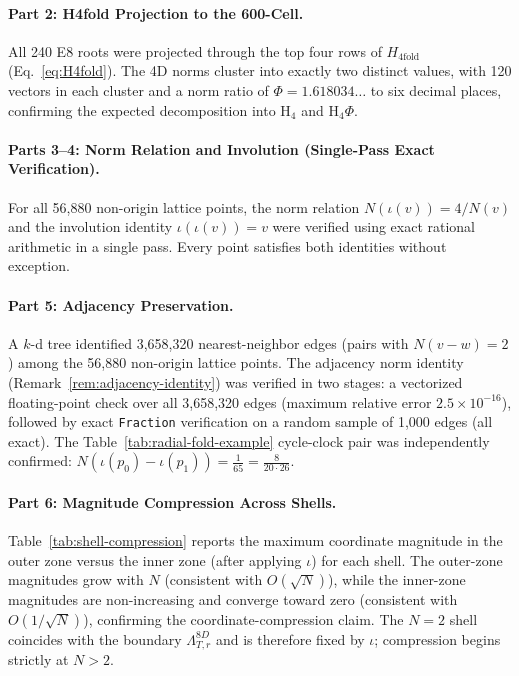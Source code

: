 \documentclass{article}
\begin{document}
\paragraph{Part 2: H4fold Projection to the 600-Cell.}
All 240 E8 roots were projected through the top four rows of $H_{4\mathrm{fold}}$ (Eq.~\ref{eq:H4fold}). The 4D norms cluster into exactly two distinct values, with 120 vectors in each cluster and a norm ratio of $\Phi = 1.618034\ldots$ to six decimal places, confirming the expected decomposition into $\mathrm{H}_4$ and $\mathrm{H}_4\Phi$.

\paragraph{Parts 3--4: Norm Relation and Involution (Single-Pass Exact Verification).}
For all 56{,}880 non-origin lattice points, the norm relation $N(\iota(v)) = 4/N(v)$ and the involution identity $\iota(\iota(v)) = v$ were verified using exact rational arithmetic in a single pass. Every point satisfies both identities without exception.

\paragraph{Part 5: Adjacency Preservation.}
A $k$-d tree identified 3{,}658{,}320 nearest-neighbor edges (pairs with $N(v - w) = 2$) among the 56{,}880 non-origin lattice points. The adjacency norm identity (Remark~\ref{rem:adjacency-identity}) was verified in two stages: a vectorized floating-point check over all 3{,}658{,}320 edges (maximum relative error $2.5 \times 10^{-16}$), followed by exact \texttt{Fraction} verification on a random sample of 1{,}000 edges (all exact). The Table~\ref{tab:radial-fold-example} cycle-clock pair was independently confirmed: $N(\iota(p_0) - \iota(p_1)) = \frac{1}{65} = \frac{8}{20 \cdot 26}$.

\paragraph{Part 6: Magnitude Compression Across Shells.}
Table~\ref{tab:shell-compression} reports the maximum coordinate magnitude in the outer zone versus the inner zone (after applying $\iota$) for each shell. The outer-zone magnitudes grow with $N$ (consistent with $O(\sqrt{N})$), while the inner-zone magnitudes are non-increasing and converge toward zero (consistent with $O(1/\sqrt{N})$), confirming the coordinate-compression claim. The $N = 2$ shell coincides with the boundary $\Lambda_{T,r}^{8D}$ and is therefore fixed by $\iota$; compression begins strictly at $N > 2$.
\end{document}
